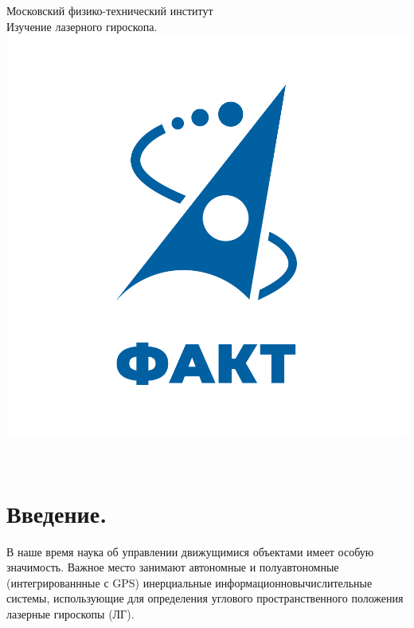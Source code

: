 \documentclass[a4paper,12pt]{article} %
\begin{document}

\begin{titlepage}
\begin{center}
	\large{Московский физико-технический институт}\\
	\vspace{100px}
	\LARGE{Изучение лазерного гироскопа.}\\
	\vspace{30px}
	\includegraphics[scale = 0.3]{fakt_logo.png}\\
\end{center}

\vfill
\begin{flushright}
	\\
\end{flushright}
\end{titlepage}

\newpage

\tableofcontents

\newpage

\section{Введение.}

В наше время наука об управлении движущимися объектами имеет особую
значимость. Важное место занимают автономные и полуавтономные (интегрированнные с GPS) инерциальные информационновычислительные системы,
использующие для определения углового пространственного положения лазерные гироскопы (ЛГ).
\end{document}
